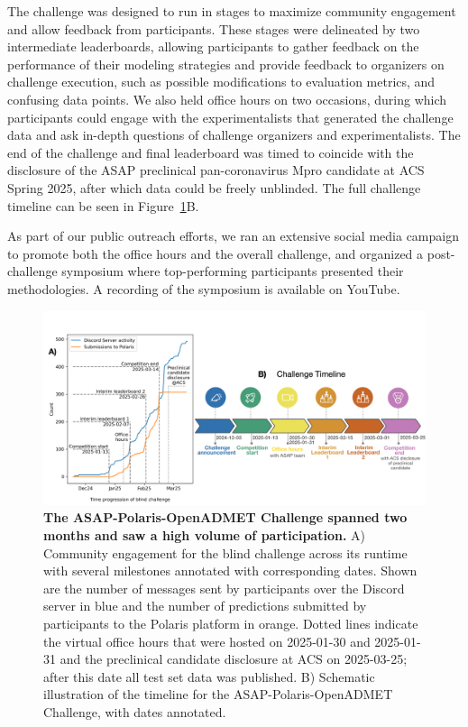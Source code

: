 \documentclass[journal=jcim,manuscript=article]{achemso}
\begin{document}
The challenge was designed to run in stages to maximize community engagement and allow feedback from participants. These stages were delineated by two intermediate leaderboards, allowing participants to gather feedback on the performance of their modeling strategies and provide feedback to organizers on challenge execution, such as possible modifications to evaluation metrics, and confusing data points. We also held office hours on two occasions, during which participants could engage with the experimentalists that generated the challenge data and ask in-depth questions of challenge organizers and experimentalists. The end of the challenge and final leaderboard was timed to coincide with the disclosure of the ASAP preclinical pan-coronavirus Mpro candidate at ACS Spring 2025\cite{griffen_2025_acs}, after which data could be freely unblinded. The full challenge timeline can be seen in Figure~\ref{fgr:timeline_engagement}B.

As part of our public outreach efforts, we ran an extensive social media campaign to promote both the office hours and the overall challenge, and organized a post-challenge symposium where top-performing participants presented their methodologies. A recording of the symposium is available on YouTube\cite{openadmet_asap_workshop}. 


\begin{figure}
    \includegraphics[scale=0.58]{fig2_timeline/Figure.png}
  \caption{\textbf{The ASAP-Polaris-OpenADMET Challenge spanned two months and saw a high volume of participation.} A) Community engagement for the blind challenge across its runtime with several milestones annotated with corresponding dates. Shown are the number of messages sent by participants over the Discord server in blue and the number of predictions submitted by participants to the Polaris platform in orange. Dotted lines indicate the virtual office hours that were hosted on 2025-01-30 and 2025-01-31 and the preclinical candidate disclosure at ACS on 2025-03-25; after this date all test set data was published. B) Schematic illustration of the timeline for the ASAP-Polaris-OpenADMET Challenge, with dates annotated.}
  \label{fgr:timeline_engagement}
\end{figure}
\end{document}
